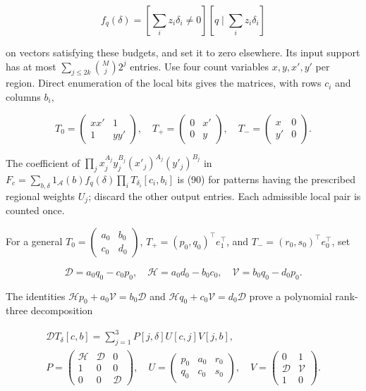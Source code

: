 \[
f_q(\delta)=\left[\sum_i z_i\delta_i\ne0\right]
\left[q\mid\sum_i z_i\delta_i\right]
\]

on vectors satisfying these budgets, and set it to zero elsewhere. Its input support has at most \(\sum_{j\le2k}\binom Mj2^j\) entries. Use four count variables \(x,y,x',y'\) per region. Direct enumeration of the local bits gives the matrices, with rows \(c_i\) and columns \(b_i\),

\[
T_0=\begin{pmatrix}xx'&1\\1&yy'\end{pmatrix},\quad
T_+=\begin{pmatrix}0&x'\\0&y\end{pmatrix},\quad
T_-=\begin{pmatrix}x&0\\y'&0\end{pmatrix}.
\tag{91}
\]

The coefficient of \(\prod_jx_j^{A_j}y_j^{B_j}(x'_j)^{A_j}(y'_j)^{B_j}\) in \(F_c=\sum_{b,\delta}1_{\mathcal A}(b)f_q(\delta)\prod_iT_{\delta_i}[c_i,b_i]\) is (90) for patterns having the prescribed regional weights \(U_j\); discard the other output entries. Each admissible local pair is counted once.

For a general \(T_0=\left(\begin{smallmatrix}a_0&b_0\\c_0&d_0\end{smallmatrix}\right)\), \(T_+=(p_0,q_0)^\top e_1^\top\), and \(T_-=(r_0,s_0)^\top e_0^\top\), set

\[
\mathcal D=a_0q_0-c_0p_0,\quad
\mathcal H=a_0d_0-b_0c_0,\quad
\mathcal V=b_0q_0-d_0p_0.
\]

The identities \(\mathcal Hp_0+a_0\mathcal V=b_0\mathcal D\) and \(\mathcal Hq_0+c_0\mathcal V=d_0\mathcal D\) prove a polynomial rank-three decomposition

\[
\begin{gathered}
\mathcal D T_\delta[c,b]
=\sum_{j=1}^3 P[j,\delta]U[c,j]V[j,b],\\
P=\begin{pmatrix}\mathcal H&\mathcal D&0\\1&0&0\\0&0&\mathcal D\end{pmatrix},\quad
U=\begin{pmatrix}p_0&a_0&r_0\\q_0&c_0&s_0\end{pmatrix},\quad
V=\begin{pmatrix}0&1\\\mathcal D&\mathcal V\\1&0\end{pmatrix}.
\end{gathered}
\tag{92}
\]


